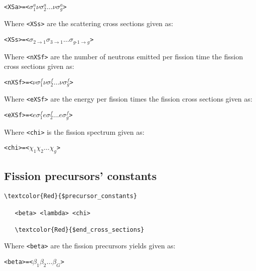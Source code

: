 \begin{alltt}
   <XSa> = < \(\sigma_{1}^{a}\) \(\nu\sigma_{2}^{a} \dots \nu\sigma_{g}^{a}\) >
\end{alltt}

\noindent
Where \verb|<XSs>| are the scattering cross sections given as:

\begin{alltt}
   <XSs> = < \(\sigma_{2\rightarrow1}\) \(\sigma_{3\rightarrow1}  \dots \sigma_{{g\text{-}1}\rightarrow{g}}\) >
\end{alltt}

\noindent
Where \verb|<nXSf>| are the number of neutrons emitted per fission time the fission cross sections given as:

\begin{alltt}
   <nXSf> = <  \(\nu\sigma_{1}^{f}\) \(\nu\sigma_{2}^{f} \dots \nu\sigma_{g}^{f}\) >
\end{alltt}

\noindent
Where \verb|<eXSf>| are the energy per fission times the fission cross sections given as:

\begin{alltt}
   <eXSf> = <  \(e\sigma_{1}^{f}\) \(e\sigma_{2}^{f} \dots e\sigma_{g}^{f}\) >
\end{alltt}

\noindent
Where \verb|<chi>| is the fission spectrum given as:

\begin{alltt}
   <chi> = < \( \chi_{1} \) \(\chi_{2}\dots\chi_{g}\) >
\end{alltt}


\subsection{Fission precursors' constants}

\begin{Verbatim}[frame=single,commandchars=\\\{\}]
   \textcolor{Red}{$precursor_constants}

   <beta> <lambda> <chi>

   \textcolor{Red}{$end_cross_sections}
\end{Verbatim}

\noindent
Where \verb|<beta>| are the fission precursors yields given as:

\begin{alltt}
   <beta> = < \(\beta_{1}\) \(\beta_{2} \dots \beta_{G}\) >
\end{alltt}

